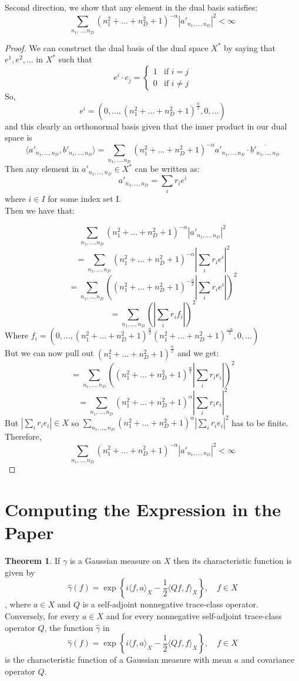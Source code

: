 \documentclass{article}
\theoremstyle{definition}
\newtheorem{theorem}{Theorem}
\begin{document}
Second direction, we show that any element in the dual basis satisfies:
\[
\sum_{n_1,..., n_D} (n_1^2 +...+ n_D^2 + 1)^{-\alpha} \left|{a'_{n_1,..., n_D}}\right|^2 < \infty
\]
\begin{proof}
We can construct the dual basis of the dual space $X^*$ by saying that $e^1, e^2,\ldots$ in $X^*$ such that 
\[
e^i\cdot e_j=
\begin{cases}
   1 &\text{if } i=j\\
   0 &\text{if } i \neq j
\end{cases}
\]
So, \[
e^i = (0,..., (n_1^2 +...+ n_D^2 + 1)^{\frac{\alpha}{2}},0,...)
\]
and this clearly an orthonormal basis given that the inner product in our dual space is 
\[
\langle a'_{n_1,\ldots,n_D}, b'_{n_1,\ldots,n_D} \rangle = \sum_{n_1,\ldots,n_D} (n_1^2 + \ldots + n_D^2 + 1)^{-\alpha} a'_{n_1,\ldots,n_D} \cdot \overline{b'_{n_1,\ldots,n_D}}
\]
Then any element in $a'_{n_1,\ldots,n_D} \in X^*$ can be written as:
\[
a'_{n_1,\ldots,n_D} = \sum_i r_i e^i
\]
where $i \in I$ for some index set I.\\
Then we have that:


\[
\sum_{n_1,..., n_D} (n_1^2 +...+ n_D^2 + 1)^{-\alpha} \left|{a'_{n_1,..., n_D}}\right|^2 
\]
\[
= \sum_{n_1,..., n_D} (n_1^2 +...+ n_D^2 + 1)^{-\alpha} \left|\sum_i r_i e^i\right|^2
\]
\[
= \sum_{n_1,..., n_D} \left((n_1^2 +...+ n_D^2 + 1)^{-\frac{\alpha}{2}} \left|\sum_i r_i e^i\right|\right)^2
\]
\[
= \sum_{n_1,..., n_D} \left( \left|\sum_i r_i f_i\right|\right)^2
\]
Where $f_i = (0,..., (n_1^2 +...+ n_D^2 + 1)^{\frac{\alpha}{2}}(n_1^2 +...+ n_D^2 + 1)^{\frac{-\alpha}{2}},0,...)$\\
But we can now pull out $(n_1^2 +...+ n_D^2 + 1)^{\frac{\alpha}{2}}$ and we get:
\[
= \sum_{n_1,..., n_D} \left((n_1^2 +...+ n_D^2 + 1)^{\frac{\alpha}{2}} \left|\sum_i r_i e_i\right|\right)^2
\]
\[
= \sum_{n_1,..., n_D} (n_1^2 +...+ n_D^2 + 1)^{\alpha} \left|\sum_i r_i e_i\right|^2
\]
But $\left|\sum_i r_i e_i\right| \in X$ so $ \sum_{n_1,..., n_D} (n_1^2 +...+ n_D^2 + 1)^{\alpha} \left|\sum_i r_i e_i\right|^2$ has to be finite.\\
Therefore, 
\[
\sum_{n_1,..., n_D} (n_1^2 +...+ n_D^2 + 1)^{-\alpha} \left|{a'_{n_1,..., n_D}}\right|^2 < \infty
\]
\end{proof}
\section{Computing the Expression in the Paper}
\begin{theorem}
  If $\gamma$ is a Gaussian measure on $X$ then its characteristic function is given by $$
\hat{\gamma}(f)=\exp \left\{i\langle f, a\rangle_{X}-\frac{1}{2}\langle Q f, f\rangle_{X}\right\}, \quad f \in X
$$, where $a \in X$ and $Q$ is a self-adjoint nonnegative trace-class operator. Conversely, for every $a \in X$ and for every nonnegative self-adjoint trace-class operator $Q$, the function $\hat{\gamma}$ in $$
\hat{\gamma}(f)=\exp \left\{i\langle f, a\rangle_{X}-\frac{1}{2}\langle Q f, f\rangle_{X}\right\}, \quad f \in X
$$ is the characteristic function of a Gaussian measure with mean $a$ and covariance operator $Q$.  
\end{theorem} 
\end{document}

